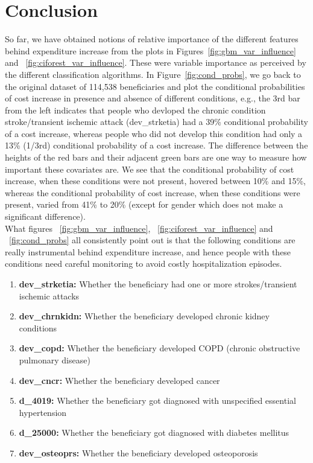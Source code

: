 \section{Conclusion}
\label{sec:concl}
So far, we have obtained notions of relative importance of the different features behind expenditure increase from the plots in Figures~\ref{fig:gbm_var_influence} and ~\ref{fig:ciforest_var_influence}. These were variable importance as perceived by the different classification algorithms. In Figure~\ref{fig:cond_probs}, we go back to the original dataset of 114,538 beneficiaries and plot the conditional probabilities of cost increase in presence and absence of different conditions, e.g., the 3rd bar from the left indicates that people who devloped the chronic condition stroke/transient ischemic attack (dev\_strketia) had a 39\% conditional probability of a cost increase, whereas people who did not develop this condition had only a 13\% (1/3rd) conditional probability of a cost increase. The difference between the heights of the red bars and their adjacent green bars are one way to measure how important these covariates are. We see that the conditional probability of cost increase, when these conditions were not present, hovered between 10\% and 15\%, whereas the conditional probability of cost increase, when these conditions were present, varied from 41\% to 20\% (except for gender which does not make a significant difference).\\

What figures ~\ref{fig:gbm_var_influence}, ~\ref{fig:ciforest_var_influence} and ~\ref{fig:cond_probs} all consistently point out is that the following conditions are really instrumental behind expenditure increase, and hence people with these conditions need careful monitoring to avoid costly hospitalization episodes.
\begin{enumerate}
\item {\bf dev\_strketia:} Whether the beneficiary had one or more strokes/transient ischemic attacks
\item {\bf dev\_chrnkidn:} Whether the beneficiary developed chronic kidney conditions
\item {\bf dev\_copd:} Whether the beneficiary developed COPD (chronic obstructive pulmonary disease)
\item {\bf dev\_cncr:} Whether the beneficiary developed cancer
\item {\bf d\_4019:} Whether the beneficiary got diagnosed with unspecified essential hypertension
\item {\bf d\_25000:} Whether the beneficiary got diagnosed with diabetes mellitus
\item {\bf dev\_osteoprs:} Whether the beneficiary developed osteoporosis
\end{enumerate}

